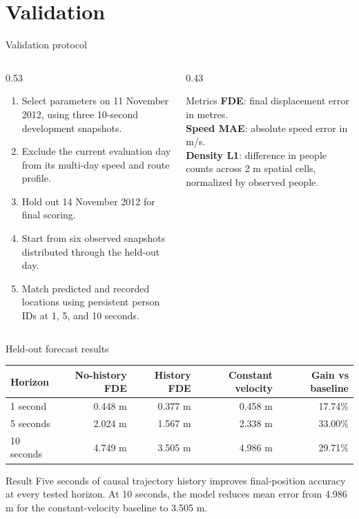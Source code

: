 \documentclass[aspectratio=169]{beamer}
\begin{document}
\section{Validation}
\begin{frame}{Validation protocol}
\begin{columns}[T]
\begin{column}{0.53\textwidth}
\begin{enumerate}
  \item Select parameters on 11 November 2012, using three 10-second development snapshots.
  \item Exclude the current evaluation day from its multi-day speed and route profile.
  \item Hold out 14 November 2012 for final scoring.
  \item Start from six observed snapshots distributed through the held-out day.
  \item Match predicted and recorded locations using persistent person IDs at 1, 5, and 10 seconds.
\end{enumerate}
\end{column}
\begin{column}{0.43\textwidth}
\begin{block}{Metrics}
\textbf{FDE}: final displacement error in metres.\\[0.15cm]
\textbf{Speed MAE}: absolute speed error in m/s.\\[0.15cm]
\textbf{Density L1}: difference in people counts across 2 m spatial cells, normalized by observed people.
\end{block}
\end{column}
\end{columns}
\end{frame}

\begin{frame}{Held-out forecast results}
\small
\centering
\renewcommand{\arraystretch}{1.25}
\begin{tabular}{lrrrr}
\toprule
\textbf{Horizon} & \textbf{No-history FDE} & \textbf{History FDE} & \textbf{Constant velocity} & \textbf{Gain vs baseline}\\
\midrule
1 second & 0.448 m & 0.377 m & 0.458 m & 17.74\%\\
5 seconds & 2.024 m & 1.567 m & 2.338 m & 33.00\%\\
10 seconds & 4.749 m & 3.505 m & 4.986 m & 29.71\%\\
\bottomrule
\end{tabular}
\vspace{0.45cm}
\begin{block}{Result}
Five seconds of causal trajectory history improves final-position accuracy at every tested horizon. At 10 seconds, the model reduces mean error from 4.986 m for the constant-velocity baseline to 3.505 m.
\end{block}
\end{frame}
\end{document}
